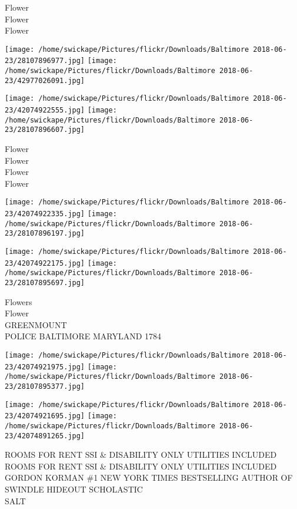 \documentclass[10pt,letterpaper]{article}
\begin{document}
Flower\\
Flower\\
Flower\\
\pagebreak

\texttt{[image: /home/swickape/Pictures/flickr/Downloads/Baltimore 2018-06-23/28107896977.jpg]}
\texttt{[image: /home/swickape/Pictures/flickr/Downloads/Baltimore 2018-06-23/42977026091.jpg]}

\texttt{[image: /home/swickape/Pictures/flickr/Downloads/Baltimore 2018-06-23/42074922555.jpg]}
\texttt{[image: /home/swickape/Pictures/flickr/Downloads/Baltimore 2018-06-23/28107896607.jpg]}

Flower\\
Flower\\
Flower\\
Flower\\
\pagebreak

\texttt{[image: /home/swickape/Pictures/flickr/Downloads/Baltimore 2018-06-23/42074922335.jpg]}
\texttt{[image: /home/swickape/Pictures/flickr/Downloads/Baltimore 2018-06-23/28107896197.jpg]}

\texttt{[image: /home/swickape/Pictures/flickr/Downloads/Baltimore 2018-06-23/42074922175.jpg]}
\texttt{[image: /home/swickape/Pictures/flickr/Downloads/Baltimore 2018-06-23/28107895697.jpg]}

Flowers\\
Flower\\
GREENMOUNT\\
POLICE BALTIMORE MARYLAND 1784\\
\pagebreak

\texttt{[image: /home/swickape/Pictures/flickr/Downloads/Baltimore 2018-06-23/42074921975.jpg]}
\texttt{[image: /home/swickape/Pictures/flickr/Downloads/Baltimore 2018-06-23/28107895377.jpg]}

\texttt{[image: /home/swickape/Pictures/flickr/Downloads/Baltimore 2018-06-23/42074921695.jpg]}
\texttt{[image: /home/swickape/Pictures/flickr/Downloads/Baltimore 2018-06-23/42074891265.jpg]}

ROOMS FOR RENT SSI \& DISABILITY ONLY UTILITIES INCLUDED\\
ROOMS FOR RENT SSI \& DISABILITY ONLY UTILITIES INCLUDED\\
GORDON KORMAN \#1 NEW YORK TIMES BESTSELLING AUTHOR OF SWINDLE HIDEOUT SCHOLASTIC\\
SALT\\
\pagebreak
\end{document}
